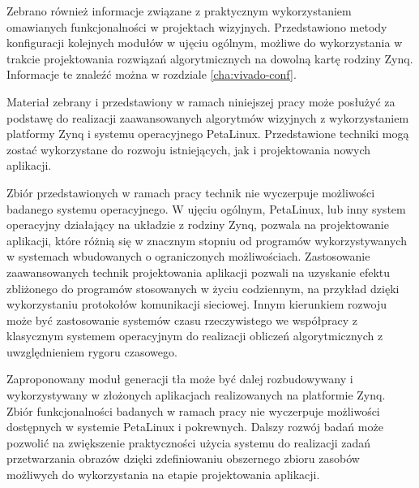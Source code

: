 Zebrano również informacje związane z praktycznym wykorzystaniem omawianych funkcjonalności w projektach wizyjnych. Przedstawiono metody konfiguracji kolejnych modułów w ujęciu ogólnym, możliwe do wykorzystania w trakcie projektowania rozwiązań algorytmicznych na dowolną kartę rodziny Zynq. Informacje te znaleźć można w rozdziale \ref{cha:vivado-conf}.

Materiał zebrany i przedstawiony w ramach niniejszej pracy może posłużyć za podstawę do realizacji zaawansowanych algorytmów wizyjnych z wykorzystaniem platformy Zynq i systemu operacyjnego PetaLinux. 
Przedstawione techniki mogą zostać wykorzystane do rozwoju istniejących, jak i projektowania nowych aplikacji.

Zbiór przedstawionych w ramach pracy technik nie wyczerpuje możliwości badanego systemu operacyjnego. 
W ujęciu ogólnym, PetaLinux, lub inny system operacyjny działający na układzie z rodziny Zynq, pozwala na projektowanie aplikacji, które różnią się w znacznym stopniu od programów wykorzystywanych w systemach wbudowanych o ograniczonych możliwościach. 
Zastosowanie zaawansowanych technik projektowania aplikacji pozwali na uzyskanie efektu zbliżonego do programów stosowanych w życiu codziennym, na przykład dzięki wykorzystaniu protokołów komunikacji sieciowej.
Innym kierunkiem rozwoju może być zastosowanie systemów czasu rzeczywistego we współpracy z klasycznym systemem operacyjnym do realizacji obliczeń algorytmicznych z uwzględnieniem rygoru czasowego.

Zaproponowany moduł generacji tła może być dalej rozbudowywany i wykorzystywany w złożonych aplikacjach realizowanych na platformie Zynq.
Zbiór funkcjonalności badanych w ramach pracy nie wyczerpuje możliwości dostępnych w systemie PetaLinux i pokrewnych. Dalszy rozwój badań może pozwolić na zwiększenie praktyczności użycia systemu do realizacji zadań przetwarzania obrazów dzięki zdefiniowaniu obszernego zbioru zasobów możliwych do wykorzystania na etapie projektowania aplikacji.

